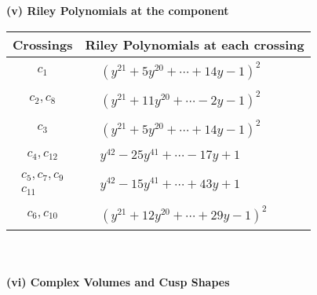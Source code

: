 \documentclass[1p]{elsarticle_modified}
\theoremstyle{definition}
\begin{document}
\newpage\renewcommand{\arraystretch}{1}
\flushleft \textbf{(v) Riley Polynomials at the component}\newline \\
\begin{tabular}{m{50pt}|m{274pt}}
Crossings & \hspace{64pt}Riley Polynomials at each crossing \\
\hline $$\begin{aligned}c_{1}\end{aligned}$$&$\begin{aligned}
&(y^{21}+5 y^{20}+\cdots+14 y-1)^{2}
\end{aligned}$\\
\hline $$\begin{aligned}c_{2},c_{8}\end{aligned}$$&$\begin{aligned}
&(y^{21}+11 y^{20}+\cdots-2 y-1)^{2}
\end{aligned}$\\
\hline $$\begin{aligned}c_{3}\end{aligned}$$&$\begin{aligned}
&(y^{21}+5 y^{20}+\cdots+14 y-1)^{2}
\end{aligned}$\\
\hline $$\begin{aligned}c_{4},c_{12}\end{aligned}$$&$\begin{aligned}
&y^{42}-25 y^{41}+\cdots-17 y+1
\end{aligned}$\\
\hline $$\begin{aligned}c_{5},c_{7},c_{9}\\c_{11}\end{aligned}$$&$\begin{aligned}
&y^{42}-15 y^{41}+\cdots+43 y+1
\end{aligned}$\\
\hline $$\begin{aligned}c_{6},c_{10}\end{aligned}$$&$\begin{aligned}
&(y^{21}+12 y^{20}+\cdots+29 y-1)^{2}
\end{aligned}$\\
\hline
\end{tabular}\\~\\
\newpage\flushleft \textbf{(vi) Complex Volumes and Cusp Shapes}
\end{document}
